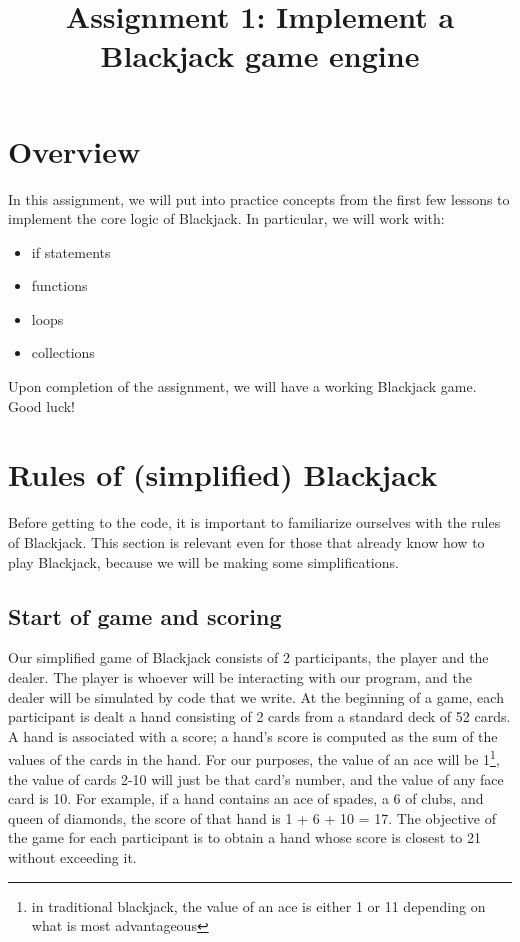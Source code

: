 \documentclass{article}
\title{Assignment 1: Implement a Blackjack game engine}
\author{}
\date{}
\begin{document}
\maketitle


\section{Overview}
In this assignment, we will put into practice concepts from the first few lessons to implement the core logic of Blackjack. In particular, we will work with:

\begin{itemize}
    \item if statements
    \item functions 
    \item loops
    \item collections
\end{itemize}

\noindent Upon completion of the assignment, we will have a working Blackjack game. Good luck!


\section{Rules of (simplified) Blackjack}
Before getting to the code, it is important to familiarize ourselves with the rules of Blackjack. This section is relevant even for those that already know how to play Blackjack, because we will be making some simplifications.

\subsection{Start of game and scoring}
Our simplified game of Blackjack consists of 2 participants, the player and the dealer. The player is whoever will be interacting with our program, and the dealer will be simulated by code that we write. At the beginning of a game, each participant is dealt a hand consisting of 2 cards from a standard deck of 52 cards. A hand is associated with a score; a hand's score is computed as the sum of the values of the cards in the hand. For our purposes, the value of an ace will be 1\footnote{in traditional blackjack, the value of an ace is either 1 or 11 depending on what is most advantageous}, the value of cards 2-10 will just be that card's number, and the value of any face card is 10. For example, if a hand contains an ace of spades, a 6 of clubs, and queen of diamonds, the score of that hand is 1 + 6 + 10 = 17. The objective of the game for each participant is to obtain a hand whose score is closest to 21 without exceeding it. 
\end{document}
